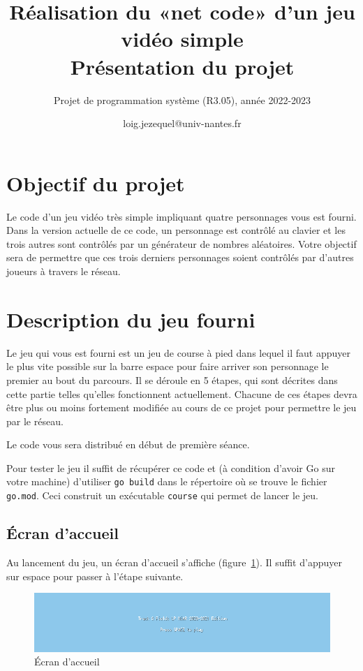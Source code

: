\documentclass[a4paper]{article}
\title{Réalisation du «net code» d'un jeu vidéo simple\\ Présentation du projet}
\author{Projet de programmation système (R3.05), année 2022-2023}
\date{loig.jezequel@univ-nantes.fr}
\begin{document}
\maketitle{}

\section{Objectif du projet}

Le code d'un jeu vidéo très simple impliquant quatre personnages vous est fourni.
Dans la version actuelle de ce code, un personnage est contrôlé au clavier et les trois autres sont contrôlés par un générateur de nombres aléatoires.
Votre objectif sera de permettre que ces trois derniers personnages soient contrôlés par d'autres joueurs à travers le réseau.

\section{Description du jeu fourni}

Le jeu qui vous est fourni est un jeu de course à pied dans lequel il faut appuyer le plus vite possible sur la barre espace pour faire arriver son personnage le premier au bout du parcours.
Il se déroule en 5 étapes, qui sont décrites dans cette partie telles qu'elles fonctionnent actuellement.
Chacune de ces étapes devra être plus ou moins fortement modifiée au cours de ce projet pour permettre le jeu par le réseau.

Le code vous sera distribué en début de première séance.

Pour tester le jeu il suffit de récupérer ce code et (à condition d'avoir Go sur votre machine) d'utiliser \verb|go build| dans le répertoire où se trouve le fichier \verb|go.mod|.
Ceci construit un exécutable \verb|course| qui permet de lancer le jeu.

\subsection{Écran d'accueil}

Au lancement du jeu, un écran d'accueil s'affiche (figure~\ref{fig:titre}). Il suffit d'appuyer sur espace pour passer à l'étape suivante.

\begin{figure}[htbp]
  \centering
  \includegraphics[width=400pt]{titre.png}
  \caption{Écran d'accueil}\label{fig:titre}
\end{figure}
\end{document}
